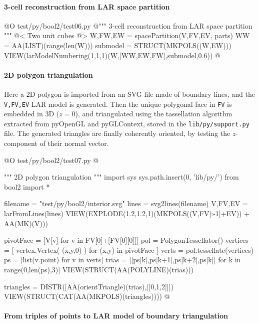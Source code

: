 \documentclass[11pt,oneside]{article}    %
\begin{document}
\paragraph{3-cell reconstruction from LAR space partition}
@O test/py/bool2/test06.py
@{""" 3-cell reconstruction from LAR space partition """
@< Two unit cubes @>
W,FW,EW = spacePartition(V,FV,EV, parts)
WW = AA(LIST)(range(len(W)))
submodel = STRUCT(MKPOLS((W,EW)))
VIEW(larModelNumbering(1,1,1)(W,[WW,EW,FW],submodel,0.6))
@}



\paragraph{2D polygon triangulation}
Here a 2D polygon is imported from an SVG file made of boundary lines, and the \texttt{V,FV,EV}
LAR model is generated. Then the unique polygonal face in \texttt{FV} is embedded in 3D ($z=0$), and triangulated using the tassellation algorithm extracted from pyOpenGL and pyGLContext, stored in the \texttt{lib/py/support.py} file. The generated triangles are finally coherently oriented, by testing the $z$-component of their normal vector.

@O test/py/bool2/test07.py
@{""" 2D polygon triangulation """
import sys
sys.path.insert(0, 'lib/py/')
from bool2 import *

filename = "test/py/bool2/interior.svg"
lines = svg2lines(filename)    
V,FV,EV = larFromLines(lines)
VIEW(EXPLODE(1.2,1.2,1)(MKPOLS((V,FV[:-1]+EV)) + AA(MK)(V)))

pivotFace = [V[v] for v in FV[0]+[FV[0][0]]]
pol = PolygonTessellator()
vertices = [ vertex.Vertex( (x,y,0) ) for (x,y) in pivotFace  ]
verts = pol.tessellate(vertices)
ps = [list(v.point) for v in verts]
trias = [[ps[k],ps[k+1],ps[k+2],ps[k]] for k in range(0,len(ps),3)]
VIEW(STRUCT(AA(POLYLINE)(trias)))

triangles = DISTR([AA(orientTriangle)(trias),[[0,1,2]]])
VIEW(STRUCT(CAT(AA(MKPOLS)(triangles))))
@}


\paragraph{From triples of points to LAR model of boundary triangulation}
    
\end{document}

